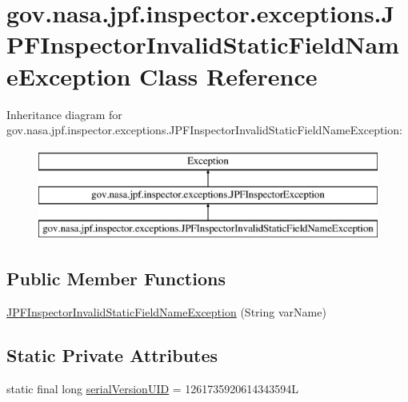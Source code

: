\hypertarget{classgov_1_1nasa_1_1jpf_1_1inspector_1_1exceptions_1_1_j_p_f_inspector_invalid_static_field_name_exception}{}\section{gov.\+nasa.\+jpf.\+inspector.\+exceptions.\+J\+P\+F\+Inspector\+Invalid\+Static\+Field\+Name\+Exception Class Reference}
\label{classgov_1_1nasa_1_1jpf_1_1inspector_1_1exceptions_1_1_j_p_f_inspector_invalid_static_field_name_exception}
Inheritance diagram for gov.\+nasa.\+jpf.\+inspector.\+exceptions.\+J\+P\+F\+Inspector\+Invalid\+Static\+Field\+Name\+Exception\+:\begin{figure}[H]
\begin{center}
\leavevmode
\includegraphics[height=3.000000cm]{classgov_1_1nasa_1_1jpf_1_1inspector_1_1exceptions_1_1_j_p_f_inspector_invalid_static_field_name_exception}
\end{center}
\end{figure}
\subsection*{Public Member Functions}
\begin{DoxyCompactItemize}
\item 
\hyperlink{classgov_1_1nasa_1_1jpf_1_1inspector_1_1exceptions_1_1_j_p_f_inspector_invalid_static_field_name_exception_acafa75b754ccef3c732709e8638c11d8}{J\+P\+F\+Inspector\+Invalid\+Static\+Field\+Name\+Exception} (String var\+Name)
\end{DoxyCompactItemize}
\subsection*{Static Private Attributes}
\begin{DoxyCompactItemize}
\item 
static final long \hyperlink{classgov_1_1nasa_1_1jpf_1_1inspector_1_1exceptions_1_1_j_p_f_inspector_invalid_static_field_name_exception_ad91ad06e3e42058db569ad749e53394a}{serial\+Version\+U\+ID} = 1261735920614343594L
\end{DoxyCompactItemize}


